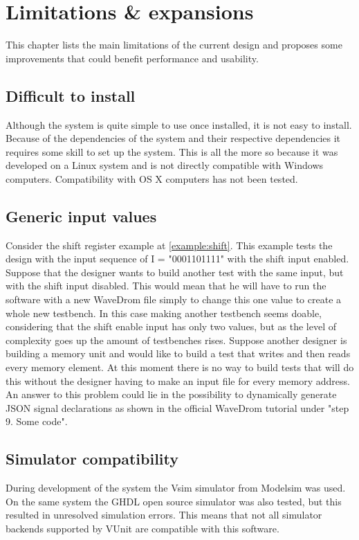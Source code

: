 \clearpage
\section{Limitations \& expansions}\label{LE}
This chapter lists the main limitations of the current design and proposes some improvements that could benefit performance and usability.
\subsection{Difficult to install}
Although the system is quite simple to use once installed, it is not easy to install. Because of the dependencies of the system and their respective dependencies it requires some skill to set up the system. This is all the more so because it was developed on a Linux system and is not directly compatible with Windows computers. Compatibility with OS X computers has not been tested.
\subsection{Generic input values}
Consider the shift register example at \ref{example:shift}. This example tests the design with the input sequence of I = "0001101111" with the shift input enabled. Suppose that the designer wants to build another test with the same input, but with the shift input disabled. This would mean that he will have to run the software with a new WaveDrom file simply to change this one value to create a whole new testbench. In this case making another testbench seems doable, considering that the shift enable input has only two values, but as the level of complexity goes up the amount of testbenches rises.
\npar
Suppose another designer is building a memory unit and would like to build a test that writes and then reads every memory element. At this moment there is no way to build tests that will do this without the designer having to make an input file for every memory address.
\npar
An answer to this problem could lie in the possibility to dynamically generate JSON signal declarations as shown in the official WaveDrom tutorial under "step 9. Some code".
\subsection{Simulator compatibility}
During development of the system the Vsim simulator from Modelsim was used. On the same system the GHDL open source simulator was also tested, but this resulted in unresolved simulation errors. This means that not all simulator backends supported by VUnit are compatible with this software.

